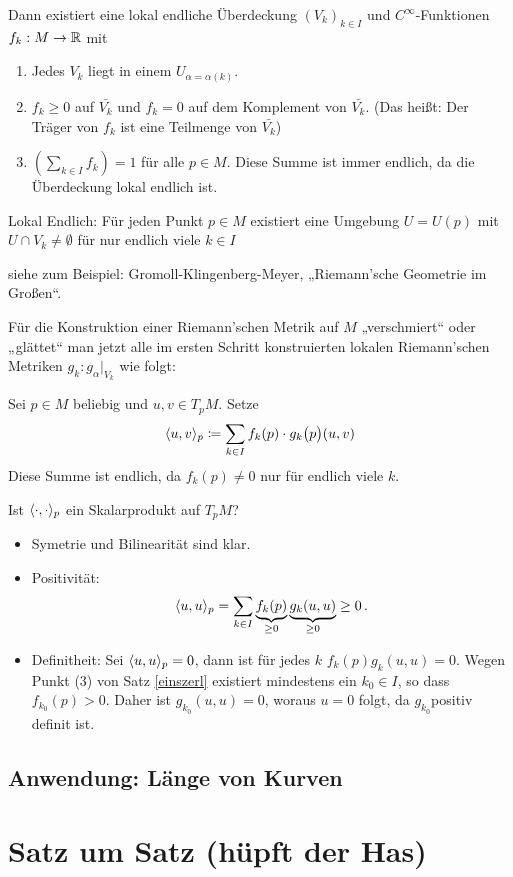 \documentclass[a4paper,twoside,DIV15,BCOR12mm]{scrbook}
\renewcommand{\da}{\coloneqq}
\begin{document}
\begin{beweis}
\begin{satz}
Dann existiert eine lokal endliche  Überdeckung $(V_k)_{k\in I}$ und $C^\infty$-Funktionen $f_k: M \to \mathbb{R}$ mit
\begin{enumerate}
\item Jedes $V_k$ liegt in einem $U_{\alpha=\alpha(k)}$.
\item $f_k\ge 0$ auf $\bar{V_k}$ und $f_k = 0$ auf dem Komplement von $\bar{V_k}$. (Das heißt: Der Träger von $f_k$ ist eine Teilmenge von $\bar{V_k}$)
\item $( \sum_{k\in I} f_k ) = 1$ für alle $p\in M$. Diese Summe ist immer endlich, da die Überdeckung lokal endlich ist. 
\end{enumerate}
\end{satz}
Lokal Endlich: {Für jeden Punkt $p\in M$ existiert eine Umgebung $U=U(p)$ mit $U\cap V_k \ne \emptyset$ für nur endlich viele $k\in I$}
\begin{beweis}
siehe zum Beispiel: Gromoll-Klingenberg-Meyer, „Riemann’sche Geometrie im Großen“.
\end{beweis}

Für die Konstruktion einer Riemann’schen Metrik auf $M$ „verschmiert“ oder „glättet“ man jetzt alle im ersten Schritt konstruierten lokalen Riemann’schen Metriken $g_k : g_\alpha|_{V_k}$ wie folgt: 

Sei $p\in M$ beliebig und $u,v \in T_pM$. Setze 
\[
\ksp uv_p \da \sum_{k\in I} f_k(p) \cdot g_k\big(p\big) (u,v)
\]
Diese Summe ist endlich, da $f_k(p) \ne 0$ nur für endlich viele $k$.

Ist $\langle\cdot,\cdot\rangle_p$ ein Skalarprodukt auf $T_pM$? 
\begin{itemize}
\item Symetrie und Bilinearität sind klar.
\item Positivität:
\[ \langle u,u\rangle_p = \sum_{k\in I} \underbrace{f_k(p)}_{\ge 0} \underbrace{g_k(u,u)}_{\ge 0} \ge 0\,.\]
\item Definitheit: Sei $\langle u,u\rangle_p = 0$, dann ist für jedes $k$ $f_k(p) g_k(u,u) = 0$. Wegen Punkt (3) von Satz \ref{einszerl} existiert mindestens ein $k_0\in I$, so dass $f_{k_0}(p) > 0$. Daher ist $g_{k_0}(u,u) = 0$, woraus $u=0$ folgt, da $g_{k_0} $positiv definit ist.
\end{itemize}

\end{beweis}


\section[Erste Anwendung von Riemann’schen Metriken: Länge von Kurven]{Anwendung: Länge von Kurven}




\appendix
\chapter{Satz um Satz (hüpft der Has)}

\renewcommand{\indexname}{Stichwortverzeichnis}
\addtocounter{chapter}{1}
\printindex
\end{document}
